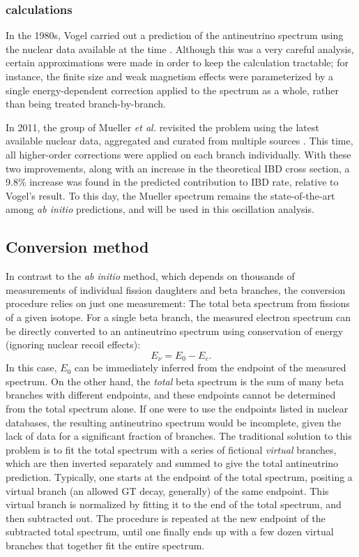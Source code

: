 \documentclass[../thesis.tex]{subfiles}
\begin{document}
\subsubsection{\ureight calculations}
\label{sec:vogel}

In the 1980s, Vogel carried out a prediction of the \ureight antineutrino spectrum using the nuclear data available at the time \cite{PhysRevC.24.1543}. Although this was a very careful analysis, certain approximations were made in order to keep the calculation tractable; for instance, the finite size and weak magnetism effects were parameterized by a single energy-dependent correction applied to the spectrum as a whole, rather than being treated branch-by-branch.

In 2011, the group of Mueller \emph{et al.} revisited the problem using the latest available nuclear data, aggregated and curated from multiple sources \cite{PhysRevC.83.054615}. This time, all higher-order corrections were applied on each branch individually. With these two improvements, along with an increase in the theoretical IBD cross section, a 9.8\% increase was found in the predicted \ureight contribution to IBD rate, relative to Vogel's result. To this day, the Mueller spectrum remains the state-of-the-art among \ureight \emph{ab initio} predictions, and will be used in this oscillation analysis.

\subsection{Conversion method}
\label{sec:conversion}

In contrast to the \emph{ab initio} method, which depends on thousands of measurements of individual fission daughters and beta branches, the conversion procedure relies on just one measurement: The total beta spectrum from fissions of a given isotope. For a single beta branch, the measured electron spectrum can be directly converted to an antineutrino spectrum using conservation of energy (ignoring nuclear recoil effects):
\begin{equation}
  E_\nu = E_0 - E_e.
\end{equation}
In this case, $E_0$ can be immediately inferred from the endpoint of the measured spectrum. On the other hand, the \emph{total} beta spectrum is the sum of many beta branches with different endpoints, and these endpoints cannot be determined from the total spectrum alone. If one were to use the endpoints listed in nuclear databases, the resulting antineutrino spectrum would be incomplete, given the lack of data for a significant fraction of branches. The traditional solution to this problem is to fit the total spectrum with a series of fictional \emph{virtual} branches, which are then inverted separately and summed to give the total antineutrino prediction. Typically, one starts at the endpoint of the total spectrum, positing a virtual branch (an allowed GT decay, generally) of the same endpoint. This virtual branch is normalized by fitting it to the end of the total spectrum, and then subtracted out. The procedure is repeated at the new endpoint of the subtracted total spectrum, until one finally ends up with a few dozen virtual branches that together fit the entire spectrum.
\end{document}
